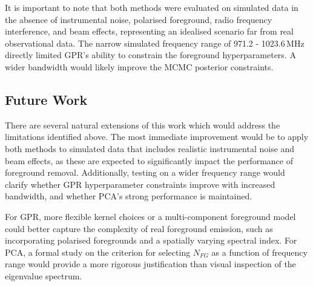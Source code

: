 
It is important to note that both methods were evaluated on simulated data in the absence of instrumental noise, polarised foreground, radio frequency interference, and beam effects, representing an idealised scenario far from real observational data. The narrow simulated frequency range of 971.2 - 1023.6\,MHz directly limited GPR's ability to constrain the foreground hyperparameters. A wider bandwidth would likely improve the MCMC posterior constraints. 

\subsection{Future Work}

There are several natural extensions of this work which would address the limitations identified above. The most immediate improvement would be to apply both methods to simulated data that includes realistic instrumental noise and beam effects, as these are expected to significantly impact the performance of foreground removal. Additionally, testing on a wider frequency range would clarify whether GPR hyperparameter constraints improve with increased bandwidth, and whether PCA's strong performance is maintained.

For GPR, more flexible kernel choices or a multi-component foreground model could better capture the complexity of real foreground emission, such as incorporating polarised foregrounds and a spatially varying spectral index. For PCA, a formal study on the criterion for selecting $N_{FG}$ as a function of frequency range would provide a more rigorous justification than visual inspection of the eigenvalue spectrum. 


